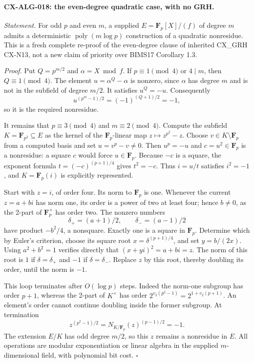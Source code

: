 \documentclass[11pt,a4paper]{article}
\begin{document}
\paragraph{CX-ALG-018: the even-degree quadratic case, with no GRH.}
\emph{Statement.} For odd $p$ and even $m$, a supplied
$E=\mathbf F_p[X]/(f)$ of degree $m$ admits a deterministic
$\operatorname{poly}(m\log p)$ construction of a quadratic nonresidue.
This is a fresh complete re-proof of the even-degree clause of inherited
CX\_GRH CX-N13, not a new claim of priority over BIMS17 Corollary 1.3.

\emph{Proof.} Put $Q=p^{m/2}$ and $\alpha=X\bmod f$.
If $p\equiv1\pmod4$ or $4\mid m$, then $Q\equiv1\pmod4$.
The element $u=\alpha^Q-\alpha$ is nonzero, since $\alpha$ has degree
$m$ and is not in the subfield of degree $m/2$. It satisfies $u^Q=-u$.
Consequently
\[
       u^{(p^m-1)/2}=(-1)^{(Q+1)/2}=-1,
\]
so it is the required nonresidue.

It remains that $p\equiv3\pmod4$ and $m\equiv2\pmod4$.
Compute the subfield $K=\mathbf F_{p^2}\subseteq E$ as the kernel of
the $\mathbf F_p$-linear map $z\mapsto z^{p^2}-z$.
Choose $v\in K\setminus\mathbf F_p$ from a computed basis and set
$u=v^p-v\ne0$. Then $u^p=-u$ and $c=u^2\in\mathbf F_p$ is a
nonresidue: a square $c$ would force $u\in\mathbf F_p$.
Because $-c$ is a square, the exponent formula
$t=(-c)^{(p+1)/4}$ gives $t^2=-c$. Thus $i=u/t$ satisfies $i^2=-1$,
and $K=\mathbf F_p(i)$ is explicitly represented.

Start with $z=i$, of order four. Its norm to $\mathbf F_p$ is one.
Whenever the current $z=a+bi$ has norm one, its order is a power of two
at least four; hence $b\ne0$, as the 2-part of $\mathbf F_p^\times$ has
order two. The nonzero numbers
\[
                 \delta_+=(a+1)/2,\qquad \delta_-=(a-1)/2
\]
have product $-b^2/4$, a nonsquare. Exactly one is a square in
$\mathbf F_p$. Determine which by Euler's criterion, choose its square
root $x=\delta^{(p+1)/4}$, and set $y=b/(2x)$.
Using $a^2+b^2=1$ verifies directly that
$(x+yi)^2=a+bi=z$. The norm of this root is $1$ if
$\delta=\delta_+$ and $-1$ if $\delta=\delta_-$.
Replace $z$ by this root, thereby doubling its order, until the norm is
$-1$.

This loop terminates after $O(\log p)$ steps. Indeed the norm-one subgroup
has order $p+1$, whereas the 2-part of $K^\times$ has order
$2^{v_2(p^2-1)}=2^{1+v_2(p+1)}$. An element's order cannot continue
doubling inside the former subgroup. At termination
\[
        z^{(p^2-1)/2}
          =N_{K/\mathbf F_p}(z)^{(p-1)/2}=-1.
\]
The extension $E/K$ has odd degree $m/2$, so this $z$ remains a nonresidue
in $E$. All operations are modular exponentiation or linear algebra in
the supplied $m$-dimensional field, with polynomial bit cost.
\hfill$\square$
\end{document}
